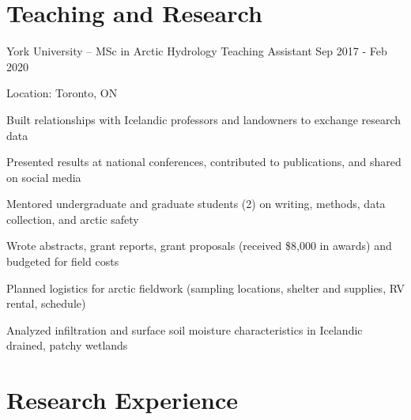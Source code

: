 \documentclass{../styles/cv}
\begin{document}
\section{Teaching and Research}

\subsectionpositiondate
    {York University -- MSc in Arctic Hydrology}
    {Teaching Assistant}
    {Sep 2017 - Feb 2020}
\resumesublistbegin
    \item Location: Toronto, ON
    \item Built relationships with Icelandic professors and landowners to exchange research data
    \item Presented results at national conferences, contributed to publications, and shared on social media
    \item Mentored undergraduate and graduate students (2) on writing, methods, data collection, and arctic safety
    \item Wrote abstracts, grant reports, grant proposals (received \$8,000 in awards) and budgeted for field costs
    \item Planned logistics for arctic fieldwork (sampling locations, shelter and supplies, RV rental, schedule)
    \item Analyzed infiltration and surface soil moisture characteristics in Icelandic drained, patchy wetlands
\resumesublistend

\section{Research Experience}
\end{document}
